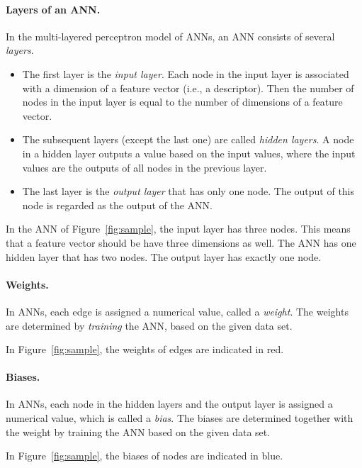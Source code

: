 \documentclass[11pt, titlepage, dvipdfmx, twoside]{article}
\newcommand{\figref}[1]{Figure~\ref{fig:#1}}
\begin{document}
\paragraph{Layers of an ANN.}
In the multi-layered perceptron model of ANNs,
an ANN consists of several \emph{layers}.
%
\begin{itemize}
  \item 
  The first layer is the {\em input layer}.
    Each node in the input layer is associated with a dimension of
    a feature vector (i.e., a descriptor). 
    Then the number of nodes in the input layer
    is equal to the number of dimensions of a feature vector. 
    
  \item 
  The subsequent layers (except the last one) are called
    {\em hidden layers}. A node in a hidden layer outputs a value
    based on the input values, where the input values
    are the outputs of all nodes in the previous layer.
    
  \item 
  The last layer is the {\em output layer} that has only one node.
    The output of this node is regarded as the output of the ANN. 
\end{itemize}

In the ANN of \figref{sample}, the input layer has three nodes.
This means that a feature vector should be have three dimensions as well.
The ANN has one hidden layer that has two nodes.
The output layer has exactly one node. 

\paragraph{Weights.}
In ANNs, each edge is assigned a numerical value, called a {\em weight}.
The weights are determined by \emph{training} the ANN, 
based on the given data set. 

In \figref{sample}, the weights of edges are indicated in red. 


\paragraph{Biases.}
In ANNs, each node in the hidden layers and the output layer
is assigned a numerical value, which is called a {\em bias}.
The biases are determined together 
with the weight by training the ANN based on the given data set. 

In \figref{sample}, the biases of nodes are indicated in blue. 
\end{document}
